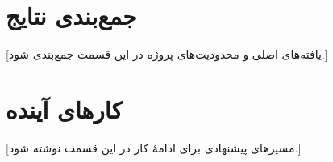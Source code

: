 \section{جمع‌بندی نتایج}
[یافته‌های اصلی و محدودیت‌های پروژه در این قسمت جمع‌بندی شود.]

\section{کارهای آینده}
[مسیرهای پیشنهادی برای ادامۀ کار در این قسمت نوشته شود.]
